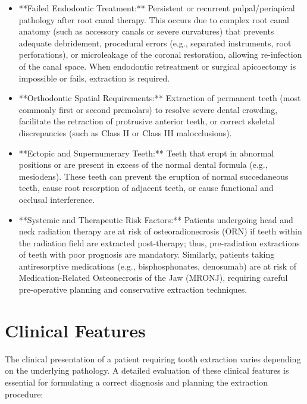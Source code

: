 \begin{itemize}
  \item **Failed Endodontic Treatment:** Persistent or recurrent pulpal/periapical pathology after root canal therapy. This occurs due to complex root canal anatomy (such as accessory canals or severe curvatures) that prevents adequate debridement, procedural errors (e.g., separated instruments, root perforations), or microleakage of the coronal restoration, allowing re-infection of the canal space. When endodontic retreatment or surgical apicoectomy is impossible or fails, extraction is required.
  \item **Orthodontic Spatial Requirements:** Extraction of permanent teeth (most commonly first or second premolars) to resolve severe dental crowding, facilitate the retraction of protrusive anterior teeth, or correct skeletal discrepancies (such as Class II or Class III malocclusions).
  \item **Ectopic and Supernumerary Teeth:** Teeth that erupt in abnormal positions or are present in excess of the normal dental formula (e.g., mesiodens). These teeth can prevent the eruption of normal succedaneous teeth, cause root resorption of adjacent teeth, or cause functional and occlusal interference.
  \item **Systemic and Therapeutic Risk Factors:** Patients undergoing head and neck radiation therapy are at risk of osteoradionecrosis (ORN) if teeth within the radiation field are extracted post-therapy; thus, pre-radiation extractions of teeth with poor prognosis are mandatory. Similarly, patients taking antiresorptive medications (e.g., bisphosphonates, denosumab) are at risk of Medication-Related Osteonecrosis of the Jaw (MRONJ), requiring careful pre-operative planning and conservative extraction techniques.
\end{itemize}

\section*{Clinical Features}
The clinical presentation of a patient requiring tooth extraction varies depending on the underlying pathology. A detailed evaluation of these clinical features is essential for formulating a correct diagnosis and planning the extraction procedure:

